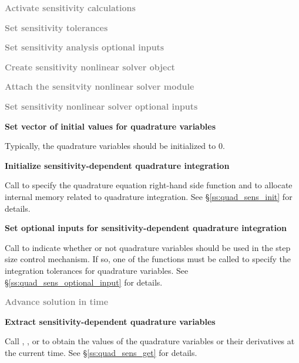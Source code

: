 \begin{Steps}
\item
  \textcolor{gray}{\bf Activate sensitivity calculations}

\item
  \textcolor{gray}{\bf Set sensitivity tolerances}

\item
  \textcolor{gray}{\bf Set sensitivity analysis optional inputs}

\item 
  \textcolor{gray}{\bf Create sensitivity nonlinear solver object}

\item
  \textcolor{gray}{\bf Attach the sensitvity nonlinear solver module}

\item
  \textcolor{gray}{\bf Set sensitivity nonlinear solver optional inputs}

\item
  {\bf Set vector of initial values for quadrature variables}

  Typically, the quadrature variables should be initialized to $0$.

\item\label{i:quad_sens_init}
  {\bf Initialize sensitivity-dependent quadrature integration}

  Call  to specify the quadrature equation right-hand
  side function and to allocate internal memory related to quadrature integration. 
  See \S\ref{ss:quad_sens_init} for details.

\item\label{i:quad_sens_optional_input}
  {\bf Set optional inputs for sensitivity-dependent quadrature integration}

  Call  to indicate whether or not quadrature variables
  should be used in the step size control mechanism. If so, one of the 
   functions  must be called to specify the integration 
  tolerances for quadrature variables.
  See \S\ref{ss:quad_sens_optional_input} for details.

\item\label{i:quad_sens_cvode_solve}
  \textcolor{gray}{\bf Advance solution in time}

\item
  {\bf Extract sensitivity-dependent quadrature variables}

  Call , ,  or 
   to obtain the values of the quadrature variables or their 
  derivatives at the current time. See \S\ref{ss:quad_sens_get} for details.


\end{Steps}
